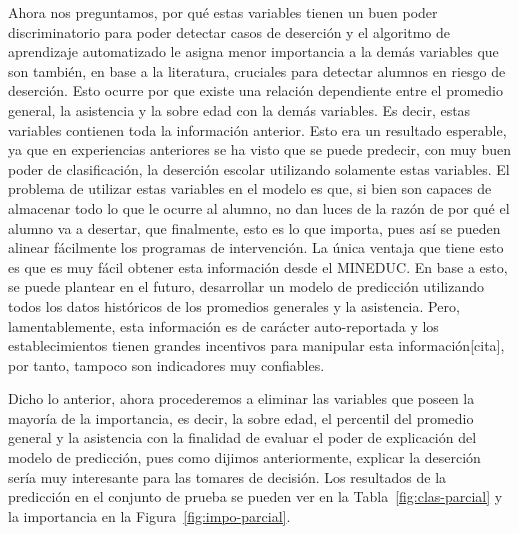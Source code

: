Ahora nos preguntamos, por qué estas variables tienen un buen poder discriminatorio para poder detectar casos de deserción y el algoritmo de aprendizaje automatizado le asigna menor importancia a la demás variables que son también, en base a la literatura, cruciales para detectar alumnos en riesgo de deserción. Esto ocurre por que existe una relación dependiente entre el promedio general, la asistencia y la sobre edad con la demás variables. Es decir, estas variables contienen toda la información anterior. Esto era un resultado esperable, ya que en experiencias anteriores se ha visto que se puede predecir, con muy buen poder de clasificación, la deserción escolar utilizando solamente estas variables. El problema de utilizar estas variables en el modelo es que, si bien son capaces de almacenar todo lo que le ocurre al alumno, no dan luces de la razón de por qué el alumno va a desertar, que finalmente, esto es lo que importa, pues así se pueden alinear fácilmente los programas de intervención. La única ventaja que tiene esto es que es muy fácil obtener esta información desde el MINEDUC. En base a esto, se puede plantear en el futuro, desarrollar un modelo de predicción utilizando todos los datos históricos de los promedios generales y la asistencia. Pero, lamentablemente, esta información es de carácter auto-reportada y los establecimientos tienen grandes incentivos para manipular esta información[cita], por tanto, tampoco son indicadores muy confiables.

Dicho lo anterior, ahora procederemos a eliminar las variables que poseen la mayoría de la importancia, es decir, la sobre edad, el percentil del promedio general y la asistencia con la finalidad de evaluar el poder de explicación del modelo de predicción, pues como dijimos anteriormente, explicar la deserción sería muy interesante para las tomares de decisión. Los resultados de la predicción en el conjunto de prueba se pueden ver en la Tabla~\ref{fig:clas-parcial} y la importancia en la Figura~\ref{fig:impo-parcial}.

